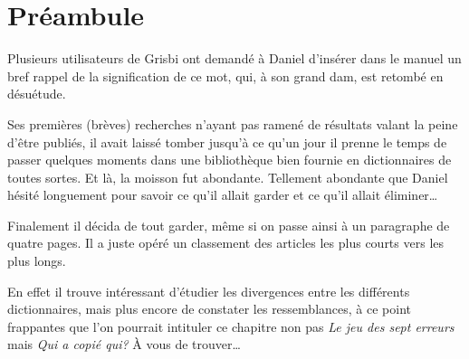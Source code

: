 

\chapter{Préambule\label{preamble}}


Plusieurs utilisateurs de \gls{Grisbi} ont demandé à Daniel  d'insérer dans le manuel un bref rappel de la signification de ce mot, qui, à son grand dam, est retombé en
désuétude.

Ses premières (brèves) recherches n'ayant pas ramené de résultats valant la peine d'être publiés, il avait laissé tomber jusqu'à ce qu'un jour il prenne le temps de passer quelques moments dans une bibliothèque bien fournie en dictionnaires de toutes sortes. Et là, la moisson fut abondante. Tellement abondante que Daniel  hésité longuement pour savoir ce qu'il allait garder et ce qu'il allait éliminer\ldots

Finalement il décida de tout garder, même si on passe ainsi à un paragraphe de quatre pages. Il a juste opéré un classement des articles les plus courts vers les plus longs.

En effet il trouve intéressant d'étudier les divergences entre les différents
dictionnaires, mais plus encore de constater les ressemblances, à ce point
frappantes que l'on pourrait intituler ce chapitre non pas \emph{Le jeu des sept
erreurs} mais \emph{Qui a copié qui?} À vous de trouver\dots

